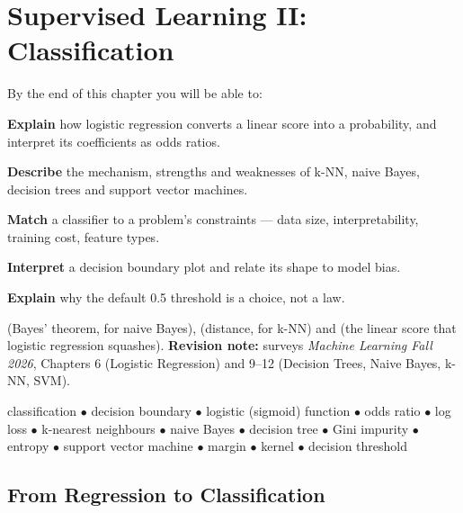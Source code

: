 \chapter{Supervised Learning II: Classification}\label{ch:classification}

\begin{outcomes}
By the end of this chapter you will be able to:
\begin{tight}
  \item \textbf{Explain} how logistic regression converts a linear score into a probability, and interpret its coefficients as odds ratios.
  \item \textbf{Describe} the mechanism, strengths and weaknesses of k-NN, naive Bayes, decision trees and support vector machines.
  \item \textbf{Match} a classifier to a problem's constraints --- data size, interpretability, training cost, feature types.
  \item \textbf{Interpret} a decision boundary plot and relate its shape to model bias.
  \item \textbf{Explain} why the default 0.5 threshold is a choice, not a law.
\end{tight}
\end{outcomes}

\begin{prereq}
 (Bayes' theorem, for naive Bayes),  (distance, for
k-NN) and  (the linear score that logistic regression squashes).
\textbf{Revision note:} surveys \emph{Machine Learning Fall 2026}, Chapters 6
(Logistic Regression) and 9--12 (Decision Trees, Naive Bayes, k-NN, SVM).
\end{prereq}

\begin{keyterms}
classification $\bullet$ decision boundary $\bullet$ logistic (sigmoid) function
$\bullet$ odds ratio $\bullet$ log loss $\bullet$ k-nearest neighbours $\bullet$
naive Bayes $\bullet$ decision tree $\bullet$ Gini impurity $\bullet$ entropy
$\bullet$ support vector machine $\bullet$ margin $\bullet$ kernel $\bullet$
decision threshold
\end{keyterms}

\section{From Regression to Classification}

